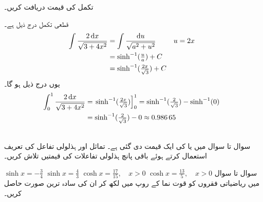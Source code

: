 تکمل  کی قیمت دریافت کریں۔

قطعی تکمل درج ذیل ہے۔
\begin{align*}
\int\frac{2\dif x}{\sqrt{3+4x^2}}&=\int\frac{\dif u}{\sqrt{a^2+u^2}}&&u=2x\\
&=\sinh^{-1}(\tfrac{u}{a})+C\\
&=\sinh^{-1}(\tfrac{2x}{\sqrt{3}})+C
\end{align*}
یوں درج ذیل ہو گا۔
\begin{align*}
\int_0^1\frac{2\dif x}{\sqrt{3+4x^2}}&=\left.\sinh^{-1}(\tfrac{2x}{\sqrt{3}})\right]_0^1=\sinh^{-1}(\tfrac{2}{\sqrt{3}})-\sinh^{-1}(0)\\
&=\sinh^{-1}(\tfrac{2}{\sqrt{3}})-0\approx \num{0.98665}
\end{align*} 


\\
سوال  تا سوال  میں  یا  کی ایک قیمت دی گئی ہے۔ تماثل  اور ہذلولی تفاعل کی تعریف استعمال کرتے ہوئے باقی پانچ ہذلولی تفاعلات  کی قیمتیں تلاش کریں۔

$\sinh x=-\tfrac{3}{4}$
$\sinh x=\tfrac{4}{3}$
$\cosh x=\tfrac{17}{15},\quad x>0$
$\cosh x=\tfrac{13}{5},\quad x>0$
سوال  تا سوال  میں ریاضیاتی  فقروں کو قوت نما کے روپ میں لکھ کر ان کی سادہ ترین صورت حاصل کریں۔

